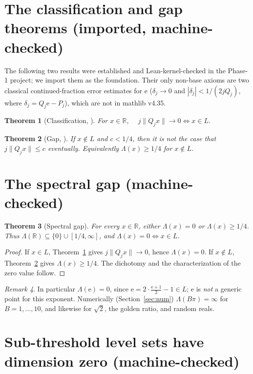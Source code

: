 \documentclass[11pt]{article}
\newtheorem{theorem}{Theorem}
\theoremstyle{definition}
\theoremstyle{remark}
\newtheorem{remark}[theorem]{Remark}
\newcommand{\R}{\mathbb{R}}
\newcommand{\ee}{\mathrm{e}}
\newcommand{\Lam}{\Lambda}
\begin{document}
\section{The classification and gap theorems (imported, machine-checked)}

The following two results were established and Lean-kernel-checked in the
Phase-1 project; we import them as the foundation. Their only non-base axioms
are two classical continued-fraction error estimates for $\ee$
($\delta_j\to0$ and $|\delta_j|<1/(2jQ_j)$, where $\delta_j=Q_j\ee-P_j$),
which are not in mathlib v4.35.

\begin{theorem}[Classification, {\cite[Thm.~2]{Phase1}}]\label{thm:class}
For $x\in\R$, $\quad j\|Q_jx\|\to0\iff x\in L.$
\end{theorem}

\begin{theorem}[Gap, {\cite[Cor.~3]{Phase1}}]\label{thm:gap}
If $x\notin L$ and $c<1/4$, then it is \emph{not} the case that
$j\|Q_jx\|\le c$ eventually. Equivalently $\Lam(x)\ge1/4$ for $x\notin L$.
\end{theorem}

\section{The spectral gap (machine-checked)}

\begin{theorem}[Spectral gap]\label{thm:spectral}
For every $x\in\R$, either $\Lam(x)=0$ or $\Lam(x)\ge1/4$. Thus
$\Lam(\R)\subseteq\{0\}\cup[1/4,\infty]$, and $\Lam(x)=0\iff x\in L$.
\end{theorem}

\begin{proof}
If $x\in L$, Theorem~\ref{thm:class} gives $j\|Q_jx\|\to0$, hence $\Lam(x)=0$.
If $x\notin L$, Theorem~\ref{thm:gap} gives $\Lam(x)\ge1/4$. The dichotomy and
the characterization of the zero value follow.
\end{proof}

\begin{remark}
In particular $\Lam(\ee)=0$, since $\ee=2\cdot\frac{\ee+1}{2}-1\in L$; $\ee$ is
\emph{not} a generic point for this exponent. Numerically (Section~\ref{sec:num})
$\Lam(B\pi)=\infty$ for $B=1,\dots,10$, and likewise for $\sqrt2$, the golden
ratio, and random reals.
\end{remark}

\section{Sub-threshold level sets have dimension zero (machine-checked)}
\end{document}
